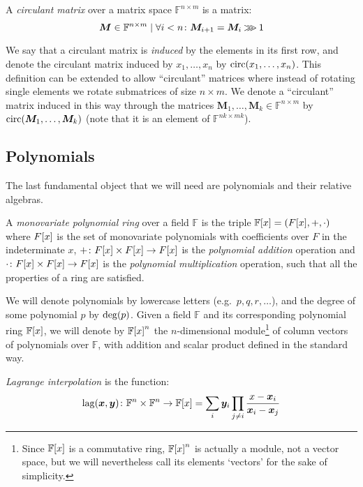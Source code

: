 \begin{definition}
  A \emph{circulant matrix} over a matrix space \(\mathbb{F}^{n \times m}\) is a matrix: 
  \[\bm{M} \in \mathbb{F}^{n \times m} \mid \forall i < n\colon \bm{M}_{i+1} = \bm{M}_i \mathbin{\ggg} 1\]
\end{definition}

We say that a circulant matrix is \emph{induced} by the elements in its first row, and denote 
the circulant matrix induced by \(x_1, \dots, x_n\) by \(\call{\circulant}{x_1, \dots, x_n}\).
This definition can be extended to allow ``circulant'' matrices where instead of rotating single 
elements we rotate submatrices of size \(n \times m\). 
We denote a ``circulant'' matrix induced in this way through the matrices 
\(\bm{M}_1, \dots, \bm{M}_k \in \mathbb{F}^{n \times m}\) by 
\(\call{\circulant}{\bm{M}_1, \dots, \bm{M}_k}\) (note that it is an element of 
\(\mathbb{F}^{nk \times mk}\)).

\subsection{Polynomials}
The last fundamental object that we will need are polynomials and their relative algebras. 
\begin{definition}
  A \emph{monovariate polynomial ring} over a field \(\mathbb{F}\) is the triple 
  \(\extend{\mathbb{F}}{x} = \Tuple{\extend{F}{x}, +, \cdot}\) where \(\extend{F}{x}\) is the set 
  of monovariate polynomials with coefficients over \(F\) in the indeterminate \(x\), 
  \(+\colon \extend{F}{x} \times \extend{F}{x} \to \extend{F}{x}\) is the \emph{polynomial addition}
  operation and \(\cdot\colon \extend{F}{x} \times \extend{F}{x} \to \extend{F}{x}\) is the
  \emph{polynomial multiplication} operation, such that all the properties of a ring are satisfied.
\end{definition}

We will denote polynomials by lowercase letters (e.g.\  \(p, q, r, \dots \)), and the degree of 
some polynomial \(p\) by \(\call{\deg}{p}\).
Given a field \(\mathbb{F}\) and its corresponding polynomial ring \(\extend{\mathbb{F}}{x}\), 
we will denote by \(\extend{\mathbb{F}}{x}^n\) the \(n\)-dimensional module\footnote{Since 
\(\extend{\mathbb{F}}{x}\) is a commutative ring, \(\extend{\mathbb{F}}{x}^n\) is actually a module, 
not a vector space, but we will nevertheless call its elements `vectors' for the sake of simplicity.} 
of 
column vectors of polynomials over \(\mathbb{F}\), with addition and scalar product defined in the 
standard way.
\begin{definition}
  \emph{Lagrange interpolation} is the function:
  \[
    \call{\lagrange}{\bm{x}, \bm{y}}\colon \mathbb{F}^n \times \mathbb{F}^n \to \extend{\mathbb{F}}{x} = 
    \sum_{i}{\bm{y}_i\prod_{j \neq i}{\frac{x - \bm{x}_i}{\bm{x}_i - \bm{x}_j}}}
  \]
\end{definition}

